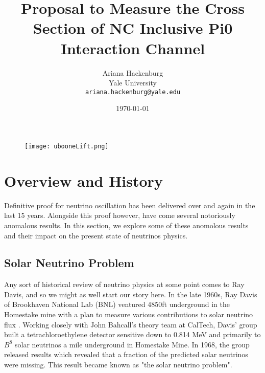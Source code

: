 \documentclass[12pt]{article}
\begin{document}
\title{Proposal to Measure the Cross Section of NC Inclusive Pi0 Interaction Channel }
\author{Ariana Hackenburg  \\Yale University \\ 
			\texttt{ariana.hackenburg@yale.edu}}
\date{\today}
\maketitle

\begin{figure}[h!]
\centering
\texttt{[image: ubooneLift.png]}
\end{figure}

\clearpage

\pagestyle{fancy}%
\fancyhead[C]{}
\renewcommand{\headrulewidth}{0.4pt}%

\tableofcontents
\listoffigures
\setcounter{tocdepth}{3} 

\clearpage

\section{Overview and History}

Definitive proof for neutrino oscillation has been delivered over and again in the last 15 years. Alongside this proof however, have come several notoriously anomalous results. In this section, we explore some of these anomolous results and their impact on the present state of neutrinos physics. 
\subsection{Solar Neutrino Problem}
Any sort of historical review of neutrino physics at some point comes to Ray Davis, and so we might as well start our story here.  In the late 1960s, Ray Davis of Brookhaven National Lab (BNL) ventured 4850ft underground in the Homestake mine with a plan to measure various contributions to solar neutrino flux \cite{ray0}. Working closely with John Bahcall's theory team at CalTech, Davis' group built a tetrachloroethylene detector sensitive down to 0.814 MeV and primarily to $B^8$ solar neutrinos\cite{ray0} a mile underground in Homestake Mine. In 1968, the group released results which revealed that a fraction of the predicted solar neutrinos were missing. This result became known as "the solar neutrino problem".
\end{document}
